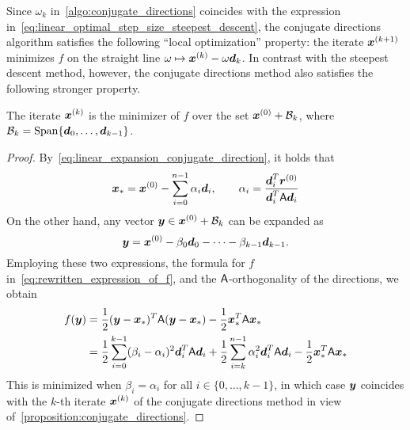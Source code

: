 Since $\omega_k$ in~\cref{algo:conjugate_directions} coincides with the expression in~\eqref{eq:linear_optimal_step_size_steepest_descent},
the conjugate directions algorithm satisfies the following ``local optimization'' property:
the iterate $\mathbf{\boldsymbol{x}}^{(k+1)}$ minimizes $f$ on the straight line $\omega \mapsto \mathbf{\boldsymbol{x}}^{(k)} - \omega \mathbf{\boldsymbol{d}}_k$.
In contrast with the steepest descent method,
however,
the conjugate directions method also satisfies the following stronger property.
\begin{proposition}
    \label{proposition:optimality_conjugate_directions}
    The iterate $\mathbf{\boldsymbol{x}}^{(k)}$ is the minimizer of $f$ over the set $\mathbf{\boldsymbol{x}}^{(0)} + \mathcal B_k$,
    where $\mathcal B_k = \operatorname{Span} \{\mathbf{\boldsymbol{d}}_0, \dotsc, \mathbf{\boldsymbol{d}}_{k-1} \}$.
\end{proposition}
\begin{proof}
    By~\eqref{eq:linear_expansion_conjugate_direction},
    it holds that
    \begin{equation*}
        \mathbf{\boldsymbol{x}}_* = \mathbf{\boldsymbol{x}}^{(0)} - \sum_{i=0}^{n-1} \alpha_i \mathbf{\boldsymbol{d}}_i,
        \qquad
        \alpha_i = \frac{\mathbf{\boldsymbol{d}}_i^T \mathbf{\boldsymbol{r}}^{(0)}}{\mathbf{\boldsymbol{d}}_i^T \mathsf A \mathbf{\boldsymbol{d}}_i}
    \end{equation*}
    On the other hand,
    any vector $\mathbf{\boldsymbol{y}} \in \mathbf{\boldsymbol{x}}^{(0)} + \mathcal B_k$ can be expanded as
    \[
        \mathbf{\boldsymbol{y}} = \mathbf{\boldsymbol{x}}^{(0)} - \beta_0 \mathbf{\boldsymbol{d}}_0 - \dotsb - \beta_{k-1} \mathbf{\boldsymbol{d}}_{k-1}.
    \]
    Employing these two expressions, the formula for $f$ in~\eqref{eq:rewritten_expression_of_f},
    and the $\mathsf A$-orthogonality of the directions,
    we obtain
    \begin{align*}
        f(\mathbf{\boldsymbol{y}})
        &= \frac{1}{2} (\mathbf{\boldsymbol{y}} - \mathbf{\boldsymbol{x}}_*)^T \mathsf A (\mathbf{\boldsymbol{y}} - \mathbf{\boldsymbol{x}}_*) - \frac{1}{2} \mathbf{\boldsymbol{x}}_*^T \mathsf A \mathbf{\boldsymbol{x}}_* \\
        &= \frac{1}{2} \sum_{i=0}^{k-1} (\beta_i - \alpha_i)^2 \mathbf{\boldsymbol{d}}_i^T \mathsf A \mathbf{\boldsymbol{d}}_i
        + \frac{1}{2} \sum_{i=k}^{n-1} \alpha_i^2 \mathbf{\boldsymbol{d}}_i^T \mathsf A \mathbf{\boldsymbol{d}}_i - \frac{1}{2} \mathbf{\boldsymbol{x}}_*^T \mathsf A \mathbf{\boldsymbol{x}}_*
    \end{align*}
    This is minimized when $\beta_i = \alpha_i$ for all $i \in \{0, \dotsc, k-1\}$,
    in which case $\mathbf{\boldsymbol{y}}$ coincides with the $k$-th iterate $\mathbf{\boldsymbol{x}}^{(k)}$ of the conjugate directions method in view of~\cref{proposition:conjugate_directions}.
\end{proof}
